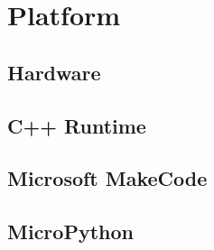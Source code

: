 \section{Platform}
\label{sec:platform}

\subsection{Hardware}

\subsection{C++ Runtime}

\subsection{Microsoft MakeCode}

\subsection{MicroPython}

